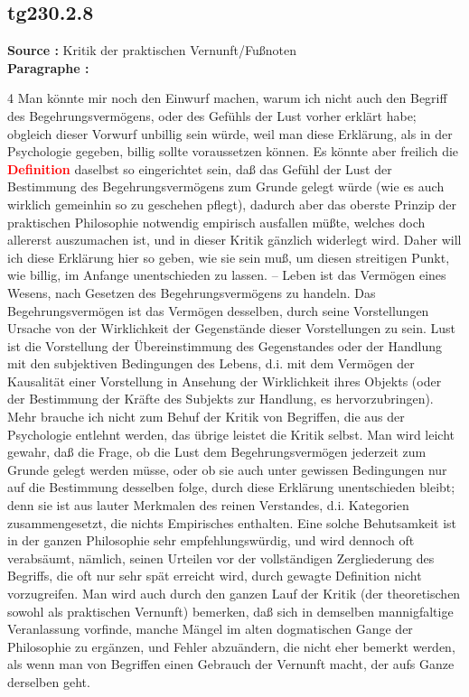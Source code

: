 \documentclass[a4paper,12pt,twoside]{book}
\newcommand{\match}[1]{\textcolor{red}{\textbf{#1}}}
\begin{document}
	\subsection*{tg230.2.8} 
	\textbf{Source : }Kritik der praktischen Vernunft/Fußnoten\\  
	
	\textbf{Paragraphe : }
	
	4 Man könnte mir noch den Einwurf machen, warum ich nicht auch den Begriff des Begehrungsvermögens, oder des Gefühls der Lust vorher erklärt habe; obgleich dieser Vorwurf unbillig sein würde, weil man diese Erklärung, als in der Psychologie gegeben, billig sollte voraussetzen können. Es könnte aber freilich die \match{Definition} daselbst so eingerichtet sein, daß das Gefühl der Lust der Bestimmung des Begehrungsvermögens zum Grunde gelegt würde (wie es auch wirklich gemeinhin so zu geschehen pflegt), dadurch aber das oberste Prinzip der praktischen Philosophie notwendig empirisch ausfallen müßte, welches doch allererst auszumachen ist, und in dieser Kritik gänzlich widerlegt wird. Daher will ich diese Erklärung hier so geben, wie sie sein muß, um diesen streitigen Punkt, wie billig, im Anfange unentschieden zu lassen. – Leben ist das Vermögen eines Wesens, nach Gesetzen des Begehrungsvermögens zu handeln. Das Begehrungsvermögen ist das Vermögen desselben, durch seine Vorstellungen Ursache von der Wirklichkeit der Gegenstände dieser Vorstellungen zu sein. Lust ist die Vorstellung der Übereinstimmung des Gegenstandes oder der Handlung mit den subjektiven Bedingungen des Lebens, d.i. mit dem Vermögen der Kausalität einer Vorstellung in Ansehung der Wirklichkeit ihres Objekts (oder der Bestimmung der Kräfte des Subjekts zur Handlung, es hervorzubringen). Mehr brauche ich nicht zum Behuf der Kritik von Begriffen, die aus der Psychologie entlehnt werden, das übrige leistet die Kritik selbst. Man wird leicht gewahr, daß die Frage, ob die Lust dem Begehrungsvermögen jederzeit zum Grunde gelegt werden müsse, oder ob sie auch unter gewissen Bedingungen nur auf die Bestimmung desselben folge, durch diese Erklärung unentschieden bleibt; denn sie ist aus lauter Merkmalen des reinen Verstandes, d.i. Kategorien zusammengesetzt, die nichts Empirisches enthalten. Eine solche Behutsamkeit ist in der ganzen Philosophie sehr empfehlungswürdig, und wird dennoch oft verabsäumt, nämlich, seinen Urteilen vor der vollständigen Zergliederung des Begriffs, die oft nur sehr spät erreicht wird, durch gewagte Definition nicht vorzugreifen. Man wird auch durch den ganzen Lauf der Kritik (der theoretischen sowohl als praktischen Vernunft) bemerken, daß sich in demselben mannigfaltige Veranlassung vorfinde, manche Mängel im alten dogmatischen Gange der Philosophie zu ergänzen, und Fehler abzuändern, die nicht eher bemerkt werden, als wenn man von Begriffen einen Gebrauch der Vernunft macht, der aufs Ganze derselben geht. 
	
\end{document}
